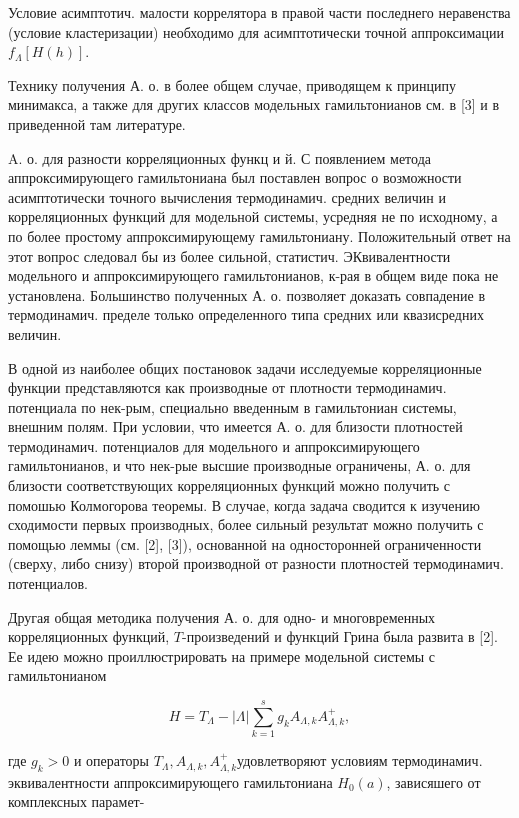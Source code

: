 \documentclass[10pt]{article}
\begin{document}
Условие асимптотич. малости коррелятора в правой части последнего неравенства (условие кластеризации) необходимо для асимптотически точной аппроксимации $f_{\Lambda}[H(h)]$.



Технику получения А. о. в более общем случае, приводящем к принципу минимакса, а также для других классов модельных гамильтонианов см. в [3] и в приведенной там литературе.



A. о. для разности корреляционных функц и й. С появлением метода аппроксимирующего гамильтониана был поставлен вопрос о возможности асимптотически точного вычисления термодинамич. средних величин и корреляционных функций для модельной системы, усредняя не по исходному, а по более простому аппроксимирующему гамильтониану. Положительный ответ на этот вопрос следовал бы из более сильной, статистич. ЭКвивалентности модельного и аппроксимирующего гамильтонианов, к-рая в общем виде пока не установлена. Большинство полученных А. о. позволяет доказать совпадение в термодинамич. пределе только определенного типа средних или квазисредних величин.



В одной из наиболее общих постановок задачи исследуемые корреляционные функции представляются как производные от плотности термодинамич. потенциала по нек-рым, специально введенным в гамильтониан системы, внешним полям. При условии, что имеется А. о. для близости плотностей термодинамич. потенциалов для модельного и аппроксимирующего гамильтонианов, и что нек-рые высшие производные ограничены, А. о. для близости соответствующих корреляционных функций можно получить с помошью Колмогорова теоремы. В случае, когда задача сводится к изучению сходимости первых производных, более сильный результат можно получить с помощью леммы (см. [2], [3]), основанной на односторонней ограниченности (сверху, либо снизу) второй производной от разности плотностей термодинамич. потенциалов.



Другая общая методика получения А. о. для одно- и многовременных корреляционных функций, $T$-произведений и функций Грина была развита в [2]. Ее идею можно проиллюстрировать на примере модельной системы с гамильтонианом



\[

H=T_{\Lambda}-|\Lambda| \sum_{k=1}^{s} g_{k} A_{\Lambda, k} A_{\Lambda, k}^{+},

\]



где $g_{k}>0$ и операторы $T_{\Lambda}, A_{\Lambda, k}, A_{\Lambda, k}^{+}$удовлетворяют условиям термодинамич. эквивалентности аппроксимирующего гамильтониана $H_{0}(a)$, зависяшего от комплексных парамет-
\end{document}
